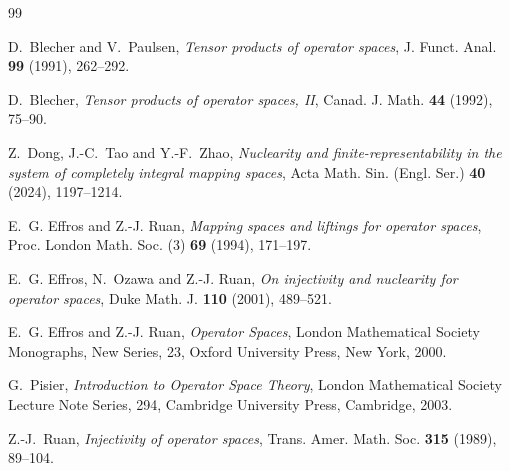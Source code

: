 \documentclass[11pt]{article}
\theoremstyle{remark}
\begin{document}
\begin{thebibliography}{99}

D.~Blecher and V.~Paulsen,
\emph{Tensor products of operator spaces},
J. Funct. Anal. \textbf{99} (1991), 262--292.

D.~Blecher,
\emph{Tensor products of operator spaces, II},
Canad. J. Math. \textbf{44} (1992), 75--90.

Z.~Dong, J.-C.~Tao and Y.-F.~Zhao,
\emph{Nuclearity and finite-representability in the system of completely
integral mapping spaces},
Acta Math. Sin. (Engl. Ser.) \textbf{40} (2024), 1197--1214.

E.~G. Effros and Z.-J. Ruan,
\emph{Mapping spaces and liftings for operator spaces},
Proc. London Math. Soc. (3) \textbf{69} (1994), 171--197.

E.~G. Effros, N.~Ozawa and Z.-J. Ruan,
\emph{On injectivity and nuclearity for operator spaces},
Duke Math. J. \textbf{110} (2001), 489--521.

E.~G. Effros and Z.-J. Ruan,
\emph{Operator Spaces},
London Mathematical Society Monographs, New Series, 23,
Oxford University Press, New York, 2000.

G.~Pisier,
\emph{Introduction to Operator Space Theory},
London Mathematical Society Lecture Note Series, 294,
Cambridge University Press, Cambridge, 2003.

Z.-J.~Ruan,
\emph{Injectivity of operator spaces},
Trans. Amer. Math. Soc. \textbf{315} (1989), 89--104.

\end{thebibliography}
\end{document}
